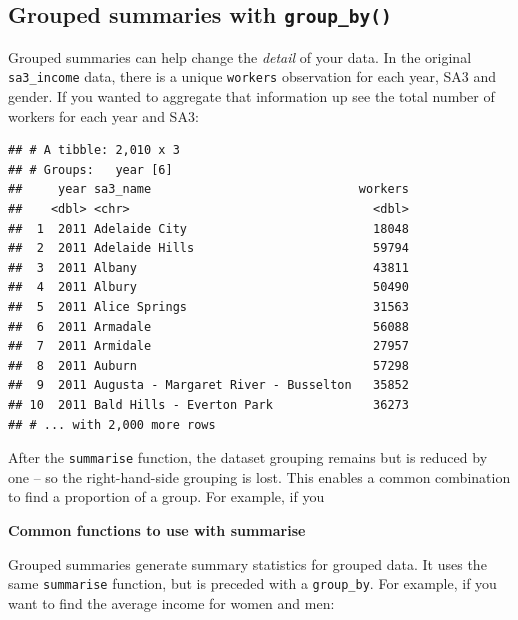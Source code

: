 \documentclass[]{book}
\newenvironment{Shaded}{\begin{snugshade}}{\end{snugshade}}
\newcommand{\DataTypeTok}[1]{\textcolor[rgb]{0.13,0.29,0.53}{#1}}
\newcommand{\KeywordTok}[1]{\textcolor[rgb]{0.13,0.29,0.53}{\textbf{#1}}}
\newcommand{\NormalTok}[1]{#1}
\newcommand{\OperatorTok}[1]{\textcolor[rgb]{0.81,0.36,0.00}{\textbf{#1}}}
\newcommand{\StringTok}[1]{\textcolor[rgb]{0.31,0.60,0.02}{#1}}
\begin{document}
\hypertarget{grouped-summaries-with-group_by}{%
\subsection{\texorpdfstring{Grouped summaries with \texttt{group\_by()}}{Grouped summaries with group\_by()}}\label{grouped-summaries-with-group_by}}

Grouped summaries can help change the \emph{detail} of your data. In the original \texttt{sa3\_income} data, there is a unique \texttt{workers} observation for each year, SA3 and gender. If you wanted to aggregate that information up see the total number of workers for each year and SA3:

\begin{Shaded}
\end{Shaded}

\begin{verbatim}
## # A tibble: 2,010 x 3
## # Groups:   year [6]
##     year sa3_name                             workers
##    <dbl> <chr>                                  <dbl>
##  1  2011 Adelaide City                          18048
##  2  2011 Adelaide Hills                         59794
##  3  2011 Albany                                 43811
##  4  2011 Albury                                 50490
##  5  2011 Alice Springs                          31563
##  6  2011 Armadale                               56088
##  7  2011 Armidale                               27957
##  8  2011 Auburn                                 57298
##  9  2011 Augusta - Margaret River - Busselton   35852
## 10  2011 Bald Hills - Everton Park              36273
## # ... with 2,000 more rows
\end{verbatim}

After the \texttt{summarise} function, the dataset grouping remains but is reduced by one -- so the right-hand-side grouping is lost. This enables a common combination to find a proportion of a group. For example, if you

\textbf{Common functions to use with summarise}

Grouped summaries generate summary statistics for grouped data. It uses the same \texttt{summarise} function, but is preceded with a \texttt{group\_by}. For example, if you want to find the average income for women and men:
\end{document}
